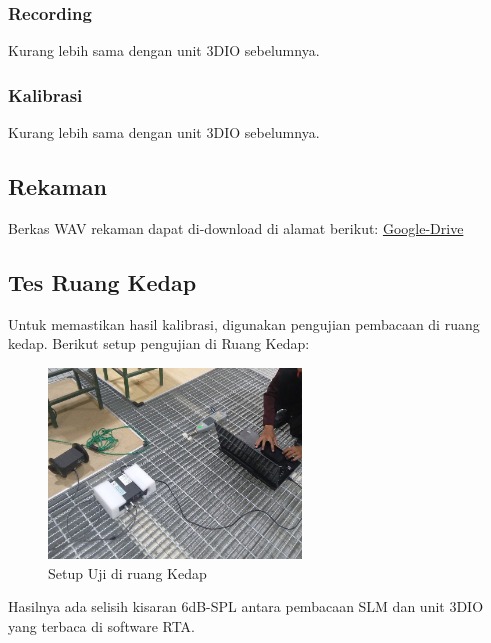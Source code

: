 \documentclass{article}
\begin{document}
	\subsubsection{Recording}
	
	Kurang lebih sama dengan unit 3DIO sebelumnya.
	
	\subsubsection{Kalibrasi}
	
	Kurang lebih sama dengan unit 3DIO sebelumnya.
	
	\newpage
	\subsection{Rekaman}
	
	Berkas WAV rekaman dapat di-download di alamat berikut: \href{https://drive.google.com/drive/folders/18bjBI3CSgyAX_4-f_cD2AvmgAtwJ-hkF}{Google-Drive}

	\subsection{Tes Ruang Kedap}
	
	Untuk memastikan hasil kalibrasi, digunakan pengujian pembacaan di ruang kedap.
	Berikut setup pengujian di Ruang Kedap:
	
	\begin{figure}[H]
		\centering
		\includegraphics[width=0.6\textwidth,angle=0]{images/tes_kedap}
		\caption{Setup Uji di ruang Kedap}
	\end{figure}
	
	Hasilnya ada selisih kisaran 6dB-SPL antara pembacaan SLM dan unit 3DIO yang terbaca di software RTA.
	
\end{document}
